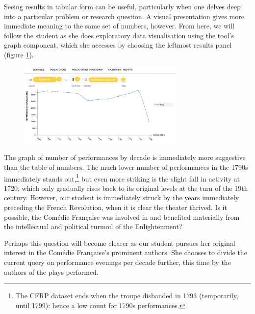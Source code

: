 \documentclass[	DIV=calc,%
							paper=a4,%
							fontsize=11pt,%
							twocolumn]{scrartcl}	 					%
\begin{document}
Seeing results in tabular form can be useful, particularly when one delves deep into a particular problem or research question.  A visual presentation gives more immediate meaning to the same set of numbers, however.  From here, we will follow the student as she does exploratory data visualisation using the tool’s graph component, which she accesses by choosing the leftmost results panel (figure \ref{fig:performances_by_decade_graph}).

\begin{figure}
  \centering
	\includegraphics[width=3.25in]{steps/performances_by_decade_graph.png}
	\caption{}
	\label{fig:performances_by_decade_graph}
\end{figure}

The graph of number of performances by decade is immediately more suggestive than the table of numbers.  The much lower number of performances in the 1790s immediately stands out,\footnote{The CFRP dataset ends when the troupe disbanded in 1793 (temporarily, until 1799): hence a low count for 1790s performances.} but even more striking is the slight fall in activity at 1720, which only gradually rises back to its original levels at the turn of the 19th century.  However, our student is immediately struck by the years immediately preceding the French Revolution, when it is clear the theater thrived.  Is it possible, the Comédie Française was involved in and benefited materially from the intellectual and political turmoil of the Enlightenment?

Perhaps this question will become clearer as our student pursues her original interest in the Comédie Française’s prominent authors.  She chooses to divide the current query on performance evenings per decade further, this time by the authors of the plays performed.
\end{document}
